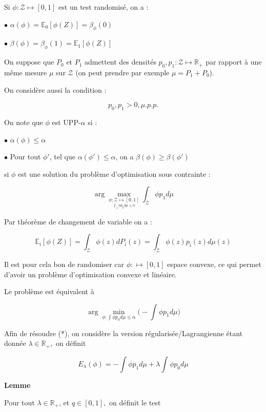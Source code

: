 \documentclass[12pt]{article}
\newcommand{\petitespace}{\vspace{0.5cm}}
\newcommand{\shift}{\hspace{2em}}
\newcommand{\bb}[1]{\mathbb{#1}} %
\newcommand{\R}{\bb{R}} %
\renewcommand{\cal}{\mathcal}
\newcommand{\Max}[1]{\max\limits_{#1}}
\newcommand{\Min}[1]{\min\limits_{#1}}
\newcommand{\1}{\bb{1}} %
\begin{document}
Si $\phi:\cal Z \mapsto [0,1]$ est un test randomisé, on a :\petitespace


\shift $\bullet$ $\alpha(\phi) = \bb E_0[\phi(Z)] = \beta_\phi(0)$\petitespace


\shift $\bullet$ $\beta(\phi) = \beta_\phi(1) = \bb E_1[\phi(Z)]$ \petitespace

On suppose que $P_0$ et $P_1$ admettent des densités $p_0, p_1 : \cal Z \mapsto \R_+$ par rapport à une même mesure $\mu$ sur $\cal Z$ (on peut prendre par exemple $\mu = P_1 + P_0$).\petitespace

On considère aussi la condition :

\begin{equation}
p_0, p_1 > 0, \mu.p.p. \tag{C}
\end{equation}


On note que $\phi$ est UPP-$\alpha$ si :\petitespace


\shift $\bullet$ $\alpha(\phi)\le \alpha$\petitespace


\shift $\bullet$ Pour tout $\phi'$, tel que $\alpha(\phi') \le \alpha$, on a $\beta(\phi) \ge \beta(\phi')$ \petitespace

si $\phi$ est une solution du problème d'optimisation sous contrainte :

$$\arg \Max{\underset{\int_{\cal Z} \phi p_0 d\mu \le \alpha}{\phi : \cal Z \mapsto [0,1]} } \int_{\cal Z} \phi p_1 d\mu$$

Par théorème de changement de variable on a :

$$\bb{E}_i[\phi(Z)] = \int_{\cal Z}\phi(z)dP_i(z) = \int_{\cal Z} \phi(z)p_i(z)d\mu(z) $$\petitespace

Il est pour cela bon de randomiser car $\phi : \mapsto [0,1]$ espace convexe, ce qui permet d'avoir un problème d'optimisation convexe et linéaire.

Le problème est équivalent à 


\begin{equation}
\arg \Min{\phi : \int \phi p_0 d\mu \le \alpha} \big(-\int \phi p_1 d\mu\big) \tag{*}
\end{equation}

Afin de résoudre (*), on considère la version régularisée/Lagrangienne étant donnée $\lambda \in \R_+,$ on définit

$$E_\lambda(\phi) = -\int \phi p_1 d\mu + \lambda\int \phi p_0 d\mu $$

\textbf{Lemme}\petitespace

Pour tout $\lambda \in \R_+$, et $q\in [0,1],$ on définit le test \petitespace
\end{document}
